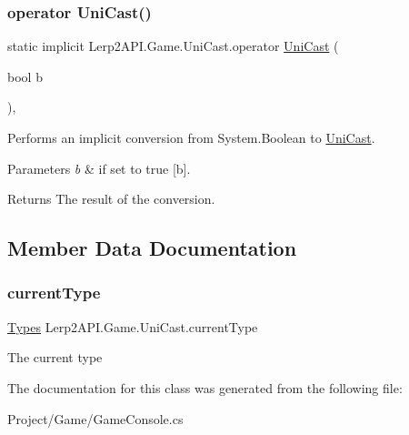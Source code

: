 \subsubsection{\texorpdfstring{operator Uni\+Cast()}{operator UniCast()}\hspace{0.1cm}{\footnotesize\ttfamily [4/4]}}
{\footnotesize\ttfamily static implicit Lerp2\+A\+P\+I.\+Game.\+Uni\+Cast.\+operator \hyperlink{class_lerp2_a_p_i_1_1_game_1_1_uni_cast}{Uni\+Cast} (\begin{DoxyParamCaption}\item[{bool}]{b }\end{DoxyParamCaption})\hspace{0.3cm}{\ttfamily [inline]}, {\ttfamily [static]}}



Performs an implicit conversion from System.\+Boolean to \hyperlink{class_lerp2_a_p_i_1_1_game_1_1_uni_cast}{Uni\+Cast}. 


\begin{DoxyParams}{Parameters}
{\em b} & if set to {\ttfamily true} \mbox{[}b\mbox{]}.\\
\hline
\end{DoxyParams}
\begin{DoxyReturn}{Returns}
The result of the conversion.
\end{DoxyReturn}


\subsection{Member Data Documentation}
\mbox{\label{class_lerp2_a_p_i_1_1_game_1_1_uni_cast_a5b53b8fda4168d5797db9498b52687ef}} 
\subsubsection{\texorpdfstring{current\+Type}{currentType}}
{\footnotesize\ttfamily \hyperlink{namespace_lerp2_a_p_i_1_1_game_a2f182da062f210cc43f341f6992ee293}{Types} Lerp2\+A\+P\+I.\+Game.\+Uni\+Cast.\+current\+Type}



The current type 



The documentation for this class was generated from the following file\+:\begin{DoxyCompactItemize}
\item 
Project/\+Game/Game\+Console.\+cs\end{DoxyCompactItemize}
